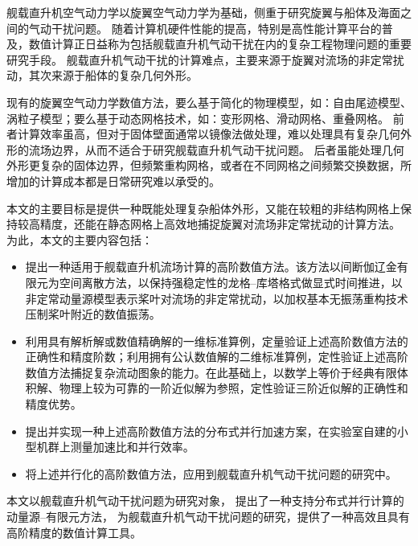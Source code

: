 
{}
\begin{cabstract}
舰载直升机空气动力学以旋翼空气动力学为基础，侧重于研究旋翼与船体及海面之间的气动干扰问题。
随着计算机硬件性能的提高，特别是高性能计算平台的普及，数值计算正日益称为包括舰载直升机气动干扰在内的复杂工程物理问题的重要研究手段。
舰载直升机气动干扰的计算难点，主要来源于旋翼对流场的非定常扰动，其次来源于船体的复杂几何外形。

现有的旋翼空气动力学数值方法，要么基于简化的物理模型，如：自由尾迹模型、涡粒子模型；要么基于动态网格技术，如：变形网格、滑动网格、重叠网格。
前者计算效率虽高，但对于固体壁面通常以镜像法做处理，难以处理具有复杂几何外形的流场边界，从而不适合于研究舰载直升机气动干扰问题。
后者虽能处理几何外形更复杂的固体边界，但频繁重构网格，或者在不同网格之间频繁交换数据，所增加的计算成本都是日常研究难以承受的。

本文的主要目标是提供一种既能处理复杂船体外形，又能在较粗的非结构网格上保持较高精度，还能在静态网格上高效地捕捉旋翼对流场非定常扰动的计算方法。
为此，本文的主要内容包括：
\begin{itemize}[wide]
\item 提出一种适用于舰载直升机流场计算的高阶数值方法。该方法以间断伽辽金有限元为空间离散方法，以保持强稳定性的龙格--库塔格式做显式时间推进，以非定常动量源模型表示桨叶对流场的非定常扰动，以加权基本无振荡重构技术压制桨叶附近的数值振荡。
\item 利用具有解析解或数值精确解的一维标准算例，定量验证上述高阶数值方法的正确性和精度阶数；利用拥有公认数值解的二维标准算例，定性验证上述高阶数值方法捕捉复杂流动图象的能力。在此基础上，以数学上等价于经典有限体积解、物理上较为可靠的一阶近似解为参照，定性验证三阶近似解的正确性和精度优势。
\item 提出并实现一种上述高阶数值方法的分布式并行加速方案，在实验室自建的小型机群上测量加速比和并行效率。
\item 将上述并行化的高阶数值方法，应用到舰载直升机气动干扰问题的研究中。
\end{itemize}

本文以舰载直升机气动干扰问题为研究对象，
提出了一种支持分布式并行计算的动量源--有限元方法，
为舰载直升机气动干扰问题的研究，提供了一种高效且具有高阶精度的数值计算工具。
\end{cabstract}

